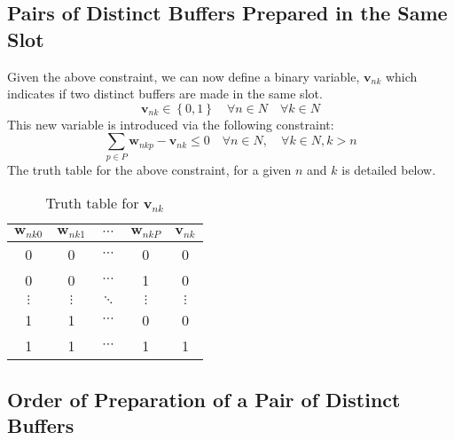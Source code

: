 \subsection{Pairs of Distinct Buffers Prepared in the Same Slot}\label{SS.constr7}

Given the above constraint, we can now define a binary variable,
$ \boldsymbol{v}_{nk} $ which indicates if two distinct buffers are made in the
same slot.
\begin{equation}
    \boldsymbol{v}_{nk} \in \left\{ 0, 1 \right\} \quad \forall n \in N \quad
    \forall k \in N
    \label{eq.v}
\end{equation}
This new variable is introduced via the following constraint:
\begin{equation}
    \sum_{p \in P} \boldsymbol{w}_{nkp} - \boldsymbol{v}_{nk} \le 0 \quad
    \forall n \in N, \quad \forall k \in N, k > n
    \label{eq.constr7}
\end{equation}
The truth table for the above constraint, for a given $n$ and $k$ is detailed
 below.
\begin{table}[h!]
    \centering
    \caption{Truth table for $\boldsymbol{v}_{nk}$}
    \label{tbl.truthv}
    \begin{tabular}{c c c c | c}
        $\boldsymbol{w}_{nk0}$ & $\boldsymbol{w}_{nk1}$ & $\cdots$
        & $\boldsymbol{w}_{nkP}$ & $\boldsymbol{v}_{nk}$ \\ \hline
        0 & 0 & $\cdots$ & 0 & 0\\
        0 & 0 & $\cdots$ & 1 & 0\\
        $\vdots$ & $\vdots$ & $\ddots$ & $\vdots$ & $\vdots$\\
        1 & 1 & $\cdots$ & 0 & 0\\
        1 & 1 & $\cdots$ & 1 & 1\\
    \end{tabular}
\end{table}

\subsection{Order of Preparation of a Pair of Distinct Buffers}\label{SS.constr8}

